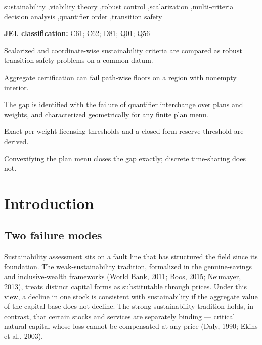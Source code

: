 \documentclass[3p,11pt]{elsarticle}
\providecommand{\jel}[1]{\par\noindent\textbf{JEL classification:} #1\par}
\begin{document}
\begin{frontmatter}
\begin{abstract}
\end{abstract}

\begin{keyword}
sustainability \sep viability theory \sep robust control \sep scalarization \sep multi-criteria decision analysis \sep quantifier order \sep transition safety
\end{keyword}

\jel{C61; C62; D81; Q01; Q56}

\begin{highlights}
\item Scalarized and coordinate-wise sustainability criteria are compared as robust transition-safety problems on a common datum.
\item Aggregate certification can fail path-wise floors on a region with nonempty interior.
\item The gap is identified with the failure of quantifier interchange over plans and weights, and characterized geometrically for any finite plan menu.
\item Exact per-weight licensing thresholds and a closed-form reserve threshold are derived.
\item Convexifying the plan menu closes the gap exactly; discrete time-sharing does not.
\end{highlights}

\end{frontmatter}

\section{Introduction}\label{introduction}

\subsection{Two failure modes}\label{two-failure-modes}

Sustainability assessment sits on a fault line that has structured the
field since its foundation. The weak-sustainability tradition,
formalized in the genuine-savings and inclusive-wealth frameworks (World
Bank, 2011; Boos, 2015; Neumayer, 2013), treats distinct capital forms
as substitutable through prices. Under this view, a decline in one stock
is consistent with sustainability if the aggregate value of the capital
base does not decline. The strong-sustainability tradition holds, in
contrast, that certain stocks and services are separately binding ---
critical natural capital whose loss cannot be compensated at any price
(Daly, 1990; Ekins et al., 2003).
\end{document}

